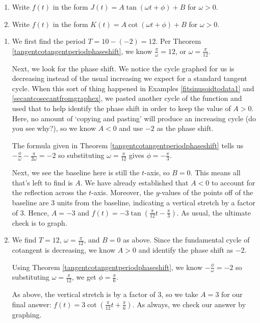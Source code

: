 \documentclass{ximera}
\begin{document}
\begin{example}
\begin{enumerate}
\item  Write $f(t)$ in the form $J(t) = A \tan( \omega t + \phi) +B$ for $\omega > 0$.

\item  Write $f(t)$ in the form $K(t) = A \cot( \omega t + \phi) +B$ for $\omega > 0$.

\end{enumerate}

\begin{explanation}

\begin{enumerate}

\item We first find the period $T = 10-(-2) = 12$.  Per Theorem \ref{tangentcotangentperiodphaseshift}, we know $\frac{\pi}{\omega} = 12$, or $\omega = \frac{\pi}{12}$.


Next, we look for the phase shift. We notice the cycle graphed for us is decreasing instead of the usual increasing we expect for a standard tangent cycle.  When this sort of thing happened in Examples \ref{fitsinusoidtodata1} and \ref{secantcosecantfromgraphex}, we pasted another cycle of the function and used that to help identify the phase shift in order to keep the value of $A> 0$.  Here, no amount of `copying and pasting' will produce an increasing cycle (do you see why?), so we know $A<0$ and use $-2$ as the phase shift.


The formula given in Theorem \ref{tangentcotangentperiodphaseshift} tells us $-\frac{\phi}{\omega} - \frac{\pi}{2 \omega} = -2$ so substituting $\omega =  \frac{\pi}{12}$ gives $\phi = -\frac{\pi}{3}$.


Next, we see the baseline here is still the $t$-axis, so $B=0$.  This means all that's left to find is $A$.  We have already established that $A<0$ to account for the reflection across the $t$-axis.   Moreover, the $y$-values of the points off of the baseline are $3$ units from the baseline, indicating a vertical stretch by a factor of $3$.  Hence, $A = -3$ and $f(t) = -3 \tan\left( \frac{\pi}{12} t - \frac{\pi}{3} \right)$.  As usual, the ultimate check is to graph.

\item  We find $T = 12$, $\omega = \frac{\pi}{12}$, and $B = 0$ as above.  Since the fundamental cycle of cotangent is decreasing, we know $A>0$ and identify the phase shift as $-2$.  


Using Theorem \ref{tangentcotangentperiodphaseshift}, we know $-\frac{\phi}{\omega} = -2$ so substituting $\omega = \frac{\pi}{12}$, we get $\phi = \frac{\pi}{6}$.


As above, the vertical stretch is by a factor of $3$, so we take $A = 3$ for our final answer:  $f(t) = 3 \cot \left( \frac{\pi}{12} t  + \frac{\pi}{6}\right)$.  As always, we check our answer by graphing. 

\end{enumerate}

\end{explanation}
\end{example}
\end{document}
